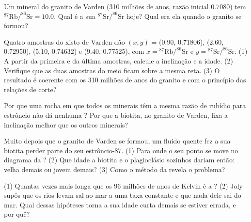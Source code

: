 \begin{exercise}[$\star\star$]\label{exo:g12:age-of-the-earth:6}
Um mineral do granito de Varden (310 milhões de anos, razão inicial 0.7080)
tem $^{87}\mathrm{Rb}/^{86}\mathrm{Sr} = 10.0$. Qual é a sua
$^{87}\mathrm{Sr}/^{86}\mathrm{Sr}$ hoje? Qual era ela quando o granito se
formou?
\end{exercise}

\begin{exercise}[$\star\star$]\label{exo:g12:age-of-the-earth:7}
Quatro amostras do xisto de Varden dão $(x, y)$ = (0.90, 0.71806),
(2.60, 0.72950), (5.10, 0.74632) e (9.40, 0.77525), com $x =
{}^{87}\mathrm{Rb}/^{86}\mathrm{Sr}$ e $y = {}^{87}\mathrm{Sr}/^{86}\mathrm{Sr}$.
(1) A partir da primeira e da última amostras, calcule a inclinação e a
idade. (2) Verifique que as duas amostras do meio ficam sobre a mesma reta.
(3) O resultado é coerente com os 310 milhões de anos do granito e com o
princípio das relações de corte?
\end{exercise}

\begin{exercise}[$\star\star$]\label{exo:g12:age-of-the-earth:8}
Por que uma rocha em que todos os minerais têm a mesma razão de rubídio para
estrôncio não dá nenhuma ? Por que a biotita, no granito de Varden,
fixa a inclinação melhor que os outros minerais?
\end{exercise}

\begin{exercise}[$\star\star$]\label{exo:g12:age-of-the-earth:9}
Muito depois que o granito de Varden se formou, um fluido quente fez a sua
biotita perder parte do seu estrôncio-87. (1) Para onde o seu ponto se move
no diagrama da ? (2) Que idade a biotita e o plagioclásio sozinhos
dariam então: velha demais ou jovem demais? (3) Como o método da 
revela o problema?
\end{exercise}

\begin{exercise}[$\star\star$]\label{exo:g12:age-of-the-earth:10}
(1) Quantas vezes mais longa que os 96 milhões de anos de Kelvin é a ? (2) Joly supôs que os rios levam sal ao mar a uma taxa constante e
que nada dele sai do mar. Qual dessas hipóteses torna a sua idade curta
demais se estiver errada, e por quê?
\end{exercise}

